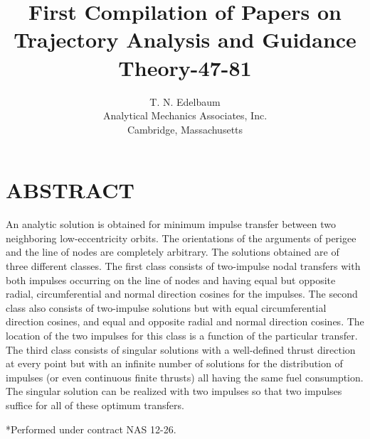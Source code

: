 \documentclass[12pt]{article}
\title{First Compilation of Papers on Trajectory Analysis and Guidance Theory-47-81}
\author{T. N. Edelbaum \\ Analytical Mechanics Associates, Inc. \\ Cambridge, Massachusetts}
\date{}
\begin{document}
\maketitle

\section*{ABSTRACT}
An analytic solution is obtained for minimum impulse transfer between two neighboring low-eccentricity orbits. The orientations of the arguments of perigee and the line of nodes are completely arbitrary. The solutions obtained are of three different classes. The first class consists of two-impulse nodal transfers with both impulses occurring on the line of nodes and having equal but opposite radial, circumferential and normal direction cosines for the impulses. The second class also consists of two-impulse solutions but with equal circumferential direction cosines, and equal and opposite radial and normal direction cosines. The location of the two impulses for this class is a function of the particular transfer. The third class consists of singular solutions with a well-defined thrust direction at every point but with an infinite number of solutions for the distribution of impulses (or even continuous finite thrusts) all having the same fuel consumption. The singular solution can be realized with two impulses so that two impulses suffice for all of these optimum transfers.

*Performed under contract NAS 12-26.
\end{document}
